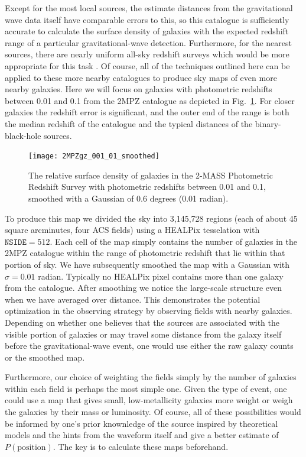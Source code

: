 \documentclass[useAMS,usenatbib]{mn2e}
\begin{document}
Except for the most local sources, the estimate distances from the
gravitational wave data itself have comparable errors to this, so this
catalogue is sufficiently accurate to calculate the surface density of
galaxies with the expected redshift range of a particular
gravitational-wave detection.  Furthermore, for the nearest sources,
there are nearly uniform all-sky redshift surveys which would be more
appropriate for this task
\citep[e.g][]{2000MNRAS.317...55S,2012ApJS..199...26H}.  Of course, all
of the techniques outlined here can be applied to these more nearby
catalogues to produce sky maps of even more nearby galaxies.  Here we
will focus on galaxies with photometric redshifts between 0.01 and 0.1
from the 2MPZ catalogue as depicted in Fig.~\ref{fig:galmap}.  For closer
galaxies the redshift error is significant, and the outer end of the
range is both the median redshift of the catalogue and the typical
distances of the binary-black-hole sources.
\begin{figure}
  \texttt{[image: 2MPZgz\_001\_01\_smoothed]}
  \caption{The relative surface density of galaxies in the 2-MASS Photometric Redshift Survey with photometric redshifts between 0.01 and 0.1, smoothed with a Gaussian of 0.6 degrees (0.01 radian).}
  \label{fig:galmap}
\end{figure}

To produce this map we divided the sky into 3,145,728 regions (each of
about 45 square arcminutes, four ACS fields) using a HEALPix
\citep{2005ApJ...622..759G} tesselation with $\mathtt{NSIDE}=512$.
Each cell of the map simply contains the number of galaxies in the
2MPZ catalogue within the range of photometric redshift that lie
within that portion of sky.  We have subsequently smoothed the map
with a Gaussian with $\sigma=0.01$ radian.  Typically no HEALPix pixel
contains more than one galaxy from the catalogue.  After smoothing we
notice the large-scale structure even when we have averaged over
distance.  This demonstrates the potential optimization in the
observing strategy by observing fields with nearby galaxies. Depending
on whether one believes that the sources are associated with the
visible portion of galaxies or may travel some distance from the
galaxy itself before the gravitational-wave event, one would use
either the raw galaxy counts or the smoothed map.

Furthermore, our choice of weighting the fields simply by the number
of galaxies within each field is perhaps the most simple one.  Given
the type of event, one could use a map that gives small,
low-metallicity galaxies more weight or weigh the galaxies by their
mass or luminosity.  Of course, all of these possibilities would be
informed by one's prior knownledge of the source inspired by
theoretical models and the hints from the waveform itself and give a
better estimate of $P(\mathrm{position})$.  The key is to calculate these
maps beforehand.
\end{document}
